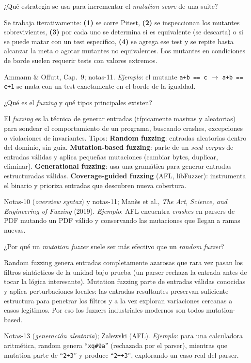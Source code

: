 \documentclass[11pt,a4paper]{article}
\newcounter{preg}
\newcommand{\qa}[3]{%
  \stepcounter{preg}%
  \vspace{0.4em}
  \begin{preguntabox}{\thepreg}
  #1
  \end{preguntabox}
  \begin{respuestabox}
  #2
  \end{respuestabox}
  \begin{refbox}
  #3
  \end{refbox}
  \vspace{0.6em}
}
\begin{document}
\qa{¿Qué estrategia se usa para incrementar el \emph{mutation score} de una suite?}
{Se trabaja iterativamente: \textbf{(1)} se corre Pitest, \textbf{(2)} se inspeccionan los mutantes sobrevivientes, \textbf{(3)} por cada uno se determina si es equivalente (se descarta) o si se puede matar con un test específico, \textbf{(4)} se agrega ese test y se repite hasta alcanzar la meta o agotar mutantes no equivalentes. Los mutantes en condiciones de borde suelen requerir tests con valores extremos.}
{Ammann \& Offutt, Cap.~9; notas-11. \emph{Ejemplo}: el mutante \texttt{a+b == c} $\to$ \texttt{a+b == c+1} se mata con un test exactamente en el borde de la igualdad.}

\qa{¿Qué es el \emph{fuzzing} y qué tipos principales existen?}
{El \emph{fuzzing} es la técnica de generar entradas (típicamente masivas y aleatorias) para sondear el comportamiento de un programa, buscando crashes, excepciones o violaciones de invariantes. Tipos: \textbf{Random fuzzing}: entradas aleatorias dentro del dominio, sin guía. \textbf{Mutation-based fuzzing}: parte de un \emph{seed corpus} de entradas válidas y aplica pequeñas mutaciones (cambiar bytes, duplicar, eliminar). \textbf{Generational fuzzing}: usa una gramática para generar entradas estructuradas válidas. \textbf{Coverage-guided fuzzing} (AFL, libFuzzer): instrumenta el binario y prioriza entradas que descubren nueva cobertura.}
{Notas-10 (\emph{overview syntax}) y notas-11; Manès et al., \emph{The Art, Science, and Engineering of Fuzzing} (2019). \emph{Ejemplo}: AFL encuentra \emph{crashes} en parsers de PDF mutando un PDF válido y conservando las mutaciones que llegan a ramas nuevas.}

\qa{¿Por qué un \emph{mutation fuzzer} suele ser más efectivo que un \emph{random fuzzer}?}
{Random fuzzing genera entradas completamente azarosas que rara vez pasan los filtros sintácticos de la unidad bajo prueba (un parser rechaza la entrada antes de tocar la lógica interesante). Mutation fuzzing parte de entradas válidas conocidas y aplica perturbaciones locales: las entradas resultantes preservan suficiente estructura para penetrar los filtros y a la vez exploran variaciones cercanas a casos legítimos. Por eso los fuzzers industriales modernos son todos mutation-based.}
{Notas-13 (\emph{generación aleatoria}); Zalewski (AFL). \emph{Ejemplo}: para una calculadora aritmética, random genera ``\texttt{xq\#9a}'' (rechazada por el parser), mientras que mutation parte de ``\texttt{2+3}'' y produce ``\texttt{2++3}'', explorando un caso real del parser.}
\end{document}
